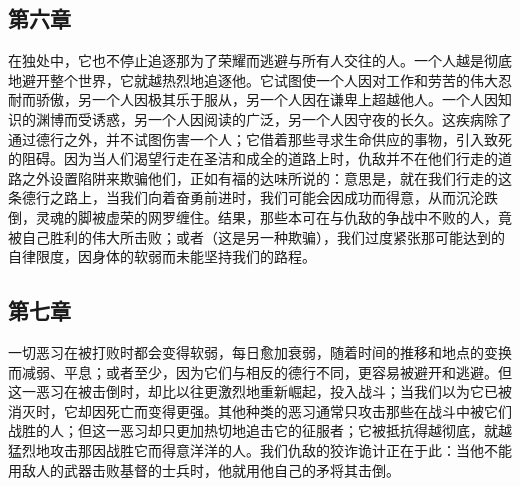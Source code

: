 
\subsection{第六章}

\par

在独处中，它也不停止追逐那为了荣耀而逃避与所有人交往的人。一个人越是彻底地避开整个世界，它就越热烈地追逐他。它试图使一个人因对工作和劳苦的伟大忍耐而骄傲，另一个人因极其乐于服从，另一个人因在谦卑上超越他人。一个人因知识的渊博而受诱惑，另一个人因阅读的广泛，另一个人因守夜的长久。这疾病除了通过德行之外，并不试图伤害一个人；它借着那些寻求生命供应的事物，引入致死的阻碍。因为当人们渴望行走在圣洁和成全的道路上时，仇敌并不在他们行走的道路之外设置陷阱来欺骗他们，正如有福的达味所说的：意思是，就在我们行走的这条德行之路上，当我们向着奋勇前进时，我们可能会因成功而得意，从而沉沦跌倒，灵魂的脚被虚荣的网罗缠住。结果，那些本可在与仇敌的争战中不败的人，竟被自己胜利的伟大所击败；或者（这是另一种欺骗），我们过度紧张那可能达到的自律限度，因身体的软弱而未能坚持我们的路程。\par


\subsection{第七章}

\par

一切恶习在被打败时都会变得软弱，每日愈加衰弱，随着时间的推移和地点的变换而减弱、平息；或者至少，因为它们与相反的德行不同，更容易被避开和逃避。但这一恶习在被击倒时，却比以往更激烈地重新崛起，投入战斗；当我们以为它已被消灭时，它却因死亡而变得更强。其他种类的恶习通常只攻击那些在战斗中被它们战胜的人；但这一恶习却只更加热切地追击它的征服者；它被抵抗得越彻底，就越猛烈地攻击那因战胜它而得意洋洋的人。我们仇敌的狡诈诡计正在于此：当他不能用敌人的武器击败基督的士兵时，他就用他自己的矛将其击倒。\par


